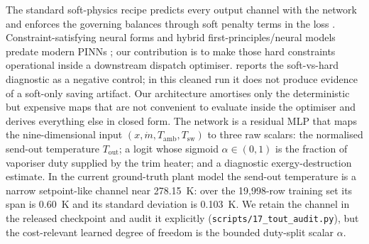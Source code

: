 \documentclass[11pt]{article}
\providecommand{\lngToutTrainSpanK}{0.60}                      %
\providecommand{\lngToutTrainStdK}{0.103}                      %
\begin{document}
The standard soft-physics recipe predicts every output channel with the network and
enforces the governing balances through soft penalty terms in the loss
\citep{raissi2019physics,wang2021understanding}. Constraint-satisfying neural
forms and hybrid first-principles/neural models predate modern PINNs
\citep{lagaris1998ann_pde,psichogios1992hybrid}; our contribution is to make
those hard constraints operational inside a downstream dispatch optimiser.
 reports the soft-vs-hard diagnostic as a
negative control; in this cleaned run it does not produce evidence of a
soft-only saving artifact. Our architecture
amortises only the deterministic but expensive maps that are not convenient to
evaluate inside the optimiser and derives everything else in closed form. The
network is a residual MLP that
maps the nine-dimensional input
$(x, \dot m, T_{\text{amb}}, T_{\text{sw}})$ to three raw scalars: the
normalised send-out temperature $T_{\text{out}}$; a logit whose sigmoid
$\alpha \in (0,1)$ is the fraction of vaporiser duty supplied by the trim
heater; and a diagnostic exergy-destruction estimate.
In the current ground-truth plant model the send-out temperature is a narrow
setpoint-like channel near \SI{278.15}{\kelvin}: over the 19,998-row training
set its span is \SI{\lngToutTrainSpanK}{\kelvin} and its standard deviation is
\SI{\lngToutTrainStdK}{\kelvin}. We retain the channel in the released
checkpoint and audit it explicitly
(\texttt{scripts/17\_tout\_audit.py}), but the cost-relevant learned degree of
freedom is the bounded duty-split scalar $\alpha$.
\end{document}

